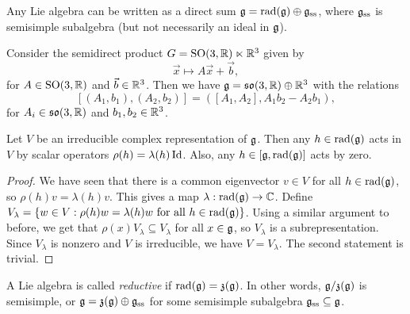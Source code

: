 \begin{theorem}[Levi]
  Any Lie algebra can be written as
  a direct sum $\mathfrak{g} = \operatorname{rad}(\mathfrak{g}) \oplus \mathfrak{g}_{\mathrm{ss}}$,
  where $\mathfrak{g}_{\mathrm{ss}}$ is semisimple
  subalgebra (but not necessarily an
  ideal in $\mathfrak{g}$).
\end{theorem}

\begin{example}
  Consider the semidirect product
  $G = \operatorname{SO}(3, \mathbb{R}) \ltimes \mathbb{R}^3$ given by
  \[
    \vec{x} \mapsto A \vec{x} + \vec{b},
  \]
  for $A \in \operatorname{SO}(3, \mathbb{R})$ and
  $\vec{b} \in \mathbb{R}^3$. Then we have
  $\mathfrak{g} = \mathfrak{so}(3, \mathbb{R}) \oplus \mathbb{R}^3$ with the
  relations
  \[
    [(A_1, b_1), (A_2, b_2)]
    = ([A_1, A_2], A_1 b_2 - A_2 b_1),
  \]
  for 
  $A_i \in \mathfrak{so}(3, \mathbb{R})$
  and
  $b_1, b_2 \in \mathbb{R}^3$.
\end{example}

\begin{theorem}
  Let $V$ be an irreducible complex
  representation of $\mathfrak{g}$. Then any
  $h \in \operatorname{rad}(\mathfrak{g})$ acts in $V$ by
  scalar operators $\rho(h) = \lambda(h) \operatorname{Id}$.
  Also, any  $h \in [\mathfrak{g}, \operatorname{rad}(\mathfrak{g})]$
  acts by zero.
\end{theorem}

\begin{proof}
  We have seen that there is a common
  eigenvector $v \in V$ for all
  $h \in \operatorname{rad}(\mathfrak{g})$, so
  $\rho(h) v = \lambda(h) v$. This gives a map
  $\lambda : \operatorname{rad}(\mathfrak{g}) \to \mathbb{C}$. Define
  $V_\lambda = \{w \in V : \rho(h) w = \lambda(h) w \text{ for all } h \in \operatorname{rad}(\mathfrak{g})\}$.
  Using a similar argument to before,
  we get that $\rho(x) V_\lambda \subseteq V_\lambda$
  for all $x \in \mathfrak{g}$, so
  $V_\lambda$ is a subrepresentation.
  Since $V_\lambda$ is nonzero and
  $V$ is irreducible, we have
  $V = V_{\lambda}$. The second
  statement is trivial.
\end{proof}

\begin{definition}
  A Lie algebra is called \emph{reductive}
  if $\operatorname{rad}(\mathfrak{g}) = \mathfrak{z}(\mathfrak{g})$.
  In other words, $\mathfrak{g} / \mathfrak{z}(\mathfrak{g})$
  is semisimple,
  or $\mathfrak{g} = \mathfrak{z}(\mathfrak{g}) \oplus \mathfrak{g}_{\mathrm{ss}}$
  for some semisimple subalgebra
  $\mathfrak{g}_{\mathrm{ss}} \subseteq \mathfrak{g}$.
\end{definition}

